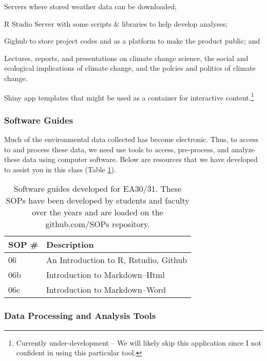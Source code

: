 \documentclass{article}\usepackage[]{graphicx}\usepackage[]{color}
\newenvironment{itemize*}%
  {\begin{itemize}%
    \setlength{\itemsep}{0pt}%
    \setlength{\parskip}{0pt}}%
  {\end{itemize}}
\begin{document}
\begin{itemize*}
  \item Servers where stored weather data can be downloaded;
  \item R Studio Server with some scripts \& libraries to help develop analyses;
  \item Gighub to store project codes and as a platform to make the product public; and
  \item Lectures, reports, and presentations on climate change science, the social and ecological implications of climate change, and the polcies and politics of climate change. 
  \item Shiny app templates that might be used as a container for interactive content.\footnote{Currently under-development -- We will likely skip this application since I not confident in using this particular tool.}
\end{itemize*}

\subsubsection{Software Guides}

Much of the environmental data collected has become electronic. Thus, to access to and process these data, we need use tools to access, pre-process, and analyze these data using computer software. Below are resources that we have developed to assist you in this class (Table \ref{tab:softwareguides}).

\begin{table}[h]
\caption{Software guides developed for EA30/31. These SOPs have been developed by students and faculty over the years and are loaded on the github.com/SOPs repository.}\label{tab:softwareguides}
\centering
\begin{tabular}{ll}\hline
SOP \#    & Description                                 \\\hline\hline
06        & An Introduction to R, Rstudio, Github       \\
06b       & Introduction to Markdown--Html              \\
06c       & Introduction to Markdown--Word              \\
\hline
\end{tabular}
\end{table}

\subsubsection{Data Processing and Analysis Tools}
\end{document}
